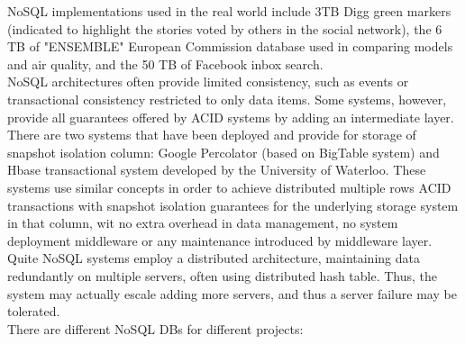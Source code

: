 NoSQL implementations used in the real world include 3TB Digg green markers (indicated to highlight the stories voted by others in the social network), the 6 TB of "ENSEMBLE" European Commission database used in comparing models and air quality, and the 50 TB of Facebook inbox search.\\

NoSQL architectures often provide limited consistency, such as events or transactional consistency restricted to only data items. Some systems, however, provide all guarantees offered by ACID systems by adding an intermediate layer. There are two systems that have been deployed and provide for storage of snapshot isolation column: Google Percolator (based on BigTable system) and Hbase transactional system developed by the University of Waterloo. These systems use similar concepts in order to achieve distributed multiple rows ACID transactions with snapshot isolation guarantees for the underlying storage system in that column, wit no extra overhead in data management, no system deployment middleware or any maintenance introduced by middleware layer.\\

Quite NoSQL systems employ a distributed architecture, maintaining data redundantly on multiple servers, often using distributed hash table. Thus, the system may actually escale adding more servers, and thus a server failure may be tolerated.\\

There are different NoSQL DBs for different projects:


